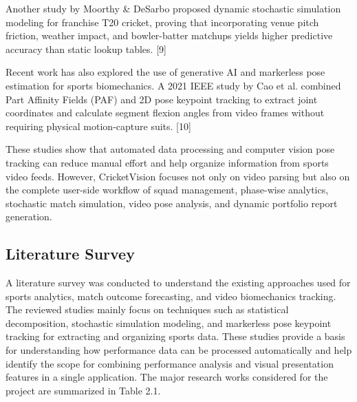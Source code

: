 Another study by Moorthy \& DeSarbo proposed dynamic stochastic simulation modeling for franchise T20 cricket, proving that incorporating venue pitch friction, weather impact, and bowler-batter matchups yields higher predictive accuracy than static lookup tables. [9]

Recent work has also explored the use of generative AI and markerless pose estimation for sports biomechanics. A 2021 IEEE study by Cao et al. combined Part Affinity Fields (PAF) and 2D pose keypoint tracking to extract joint coordinates and calculate segment flexion angles from video frames without requiring physical motion-capture suits. [10]

These studies show that automated data processing and computer vision pose tracking can reduce manual effort and help organize information from sports video feeds. However, CricketVision focuses not only on video parsing but also on the complete user-side workflow of squad management, phase-wise analytics, stochastic match simulation, video pose analysis, and dynamic portfolio report generation.

\subsection{Literature Survey}
A literature survey was conducted to understand the existing approaches used for sports analytics, match outcome forecasting, and video biomechanics tracking. The reviewed studies mainly focus on techniques such as statistical decomposition, stochastic simulation modeling, and markerless pose keypoint tracking for extracting and organizing sports data. These studies provide a basis for understanding how performance data can be processed automatically and help identify the scope for combining performance analysis and visual presentation features in a single application. The major research works considered for the project are summarized in Table 2.1.

